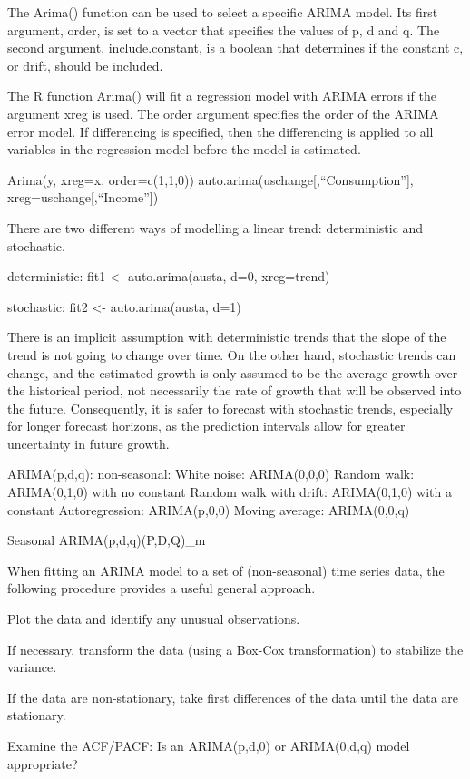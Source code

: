 \documentclass[]{book}
\begin{document}
The Arima() function can be used to select a specific ARIMA model. Its first argument, order, is set to a vector that specifies the values of p, d and q. The second argument, include.constant, is a boolean that determines if the constant c, or drift, should be included.

The R function Arima() will fit a regression model with ARIMA errors if the argument xreg is used. The order argument specifies the order of the ARIMA error model. If differencing is specified, then the differencing is applied to all variables in the regression model before the model is estimated.

Arima(y, xreg=x, order=c(1,1,0)) auto.arima(uschange{[},``Consumption''{]}, xreg=uschange{[},``Income''{]})

There are two different ways of modelling a linear trend: deterministic and stochastic.

deterministic: fit1 \textless{}- auto.arima(austa, d=0, xreg=trend)

stochastic: fit2 \textless{}- auto.arima(austa, d=1)

There is an implicit assumption with deterministic trends that the slope of the trend is not going to change over time. On the other hand, stochastic trends can change, and the estimated growth is only assumed to be the average growth over the historical period, not necessarily the rate of growth that will be observed into the future. Consequently, it is safer to forecast with stochastic trends, especially for longer forecast horizons, as the prediction intervals allow for greater uncertainty in future growth.

ARIMA(p,d,q): non-seasonal: White noise: ARIMA(0,0,0) Random walk: ARIMA(0,1,0) with no constant Random walk with drift: ARIMA(0,1,0) with a constant Autoregression: ARIMA(p,0,0) Moving average: ARIMA(0,0,q)

Seasonal ARIMA(p,d,q)(P,D,Q)\_m

When fitting an ARIMA model to a set of (non-seasonal) time series data, the following procedure provides a useful general approach.

Plot the data and identify any unusual observations.

If necessary, transform the data (using a Box-Cox transformation) to stabilize the variance.

If the data are non-stationary, take first differences of the data until the data are stationary.

Examine the ACF/PACF: Is an ARIMA(p,d,0) or ARIMA(0,d,q) model appropriate?
\end{document}

